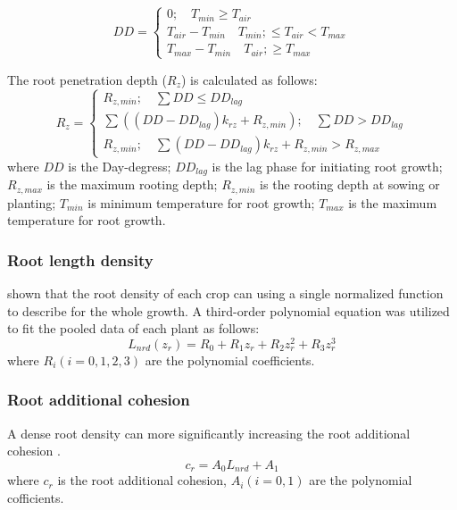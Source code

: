 \begin{equation}DD = \left \{\begin{array}{c}0; \quad T_{min} \ge T_{air} \\
T_{air}-T_{min}\quad T_{min}; \le T_{air} < T_{max} \\
T_{max}-T_{min}\quad T_{air}; \ge T_{max}\end{array} \right.\end{equation}

The root penetration depth ($R_z$) is calculated as follows:
\begin{equation}R_z = \left \{\begin{array}{c}R_{z,min}; \quad \sum DD \le DD_{lag} \\
\sum ((DD-DD_{lag})k_{rz}+R_{z,min});\quad \sum DD>DD_{lag} \\
R_{z,min};\quad \sum(DD-DD_{lag})k_{rz}+R_{z,min}>R_{z,max}\end{array} \right.\end{equation}
where $DD$ is the Day-degress; $DD_{lag}$ is the lag phase for initiating root growth;
$R_{z,max}$ is the maximum rooting depth; $R_{z,min}$ is the rooting depth at sowing or planting; $T_{min}$ is minimum temperature for root growth; $T_{max}$ is the maximum temperature for root growth.

\subsubsection{Root length density}
\cite{WuMod} shown that the root density of each crop can using a single normalized function to describe for the whole growth. A third-order polynomial equation was utilized to fit the pooled data of each plant as follows:
\begin{equation}L_{nrd}(z_r) = R_0 + R_1z_r+R_2z_r^2+R_3z_r^3\end{equation}
where $R_i (i=0,1,2,3) $ are the polynomial coefficients.

\subsubsection{Root additional cohesion}
A dense root density can more significantly increasing the root additional cohesion \citep{OsmanParameters, Zhang2015Effects}. 
\begin{equation}c_r=A_0 L_{nrd}+A_1\end{equation}
where $c_r$ is the root additional cohesion, $A_i(i=0,1)$ are the polynomial cofficients.

